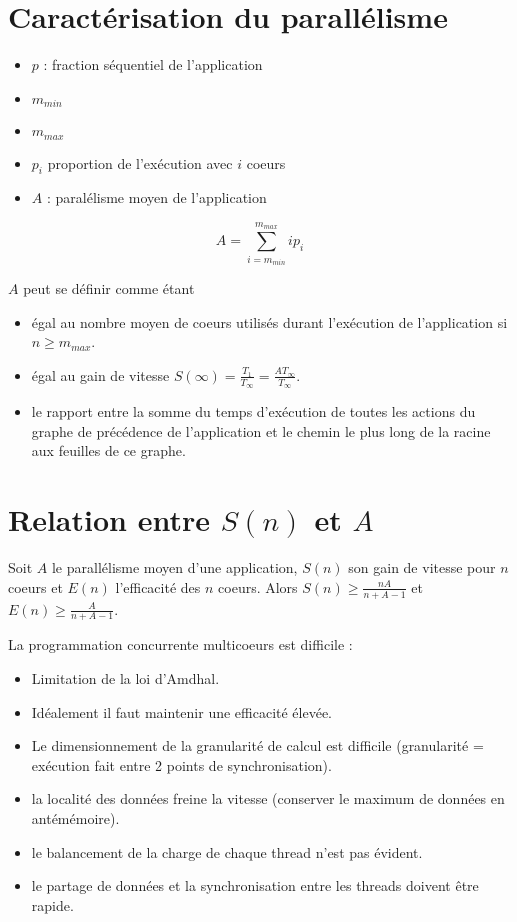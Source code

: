 \documentclass[11pt,a4paper]{report}
\begin{document}
\section{Caractérisation du parallélisme} %
\label{sec:Caractérisation du parallélisme}

\begin{itemize}
    \item $p$ : fraction séquentiel de l'application
    \item $m_{min}$
    \item $m_{max}$
    \item $p_i$ proportion de l'exécution avec $i$ coeurs
    \item $A$ : paralélisme moyen de l'application 
\end{itemize}

$$A = \sum^{m_{max}}_{i=m_{min}}i p_i$$

$A$ peut se définir comme étant
\begin{itemize}
    \item égal au nombre moyen de coeurs utilisés durant l'exécution de l'application si $n \geq
        m_{max}$.
    \item égal au gain de vitesse $S(\infty)=\frac{T_1}{T_{\infty}}=\frac{A
        T{_\infty}}{T_{\infty}}$.
    \item le rapport entre la somme du temps d'exécution de toutes les actions du graphe de
        précédence de l'application et le chemin le plus long de la racine aux feuilles de ce
        graphe.
\end{itemize}

\section{Relation entre $S(n)$ et $A$} %
\label{sec:Relation entre $S(n)$ et $A$}

Soit $A$ le parallélisme moyen d'une application, $S(n)$ son gain de vitesse pour
$n$ coeurs et $E(n)$ l'efficacité des $n$ coeurs. Alors $S(n) \geq \frac{nA}{n+A-1}$ et $E(n) \geq
\frac{A}{n+A-1}$.


La programmation concurrente multicoeurs est difficile :
\begin{itemize}
    \item Limitation de la loi d'Amdhal.
    \item Idéalement il faut maintenir une efficacité élevée.
    \item Le dimensionnement de la granularité de calcul est difficile (granularité = exécution fait
        entre 2 points de synchronisation).
    \item la localité des données freine la vitesse (conserver le maximum de données en
        antémémoire).
    \item le balancement de la charge de chaque thread n'est pas évident.
    \item le partage de données et la synchronisation entre les threads doivent être rapide.
\end{itemize}
\end{document}
